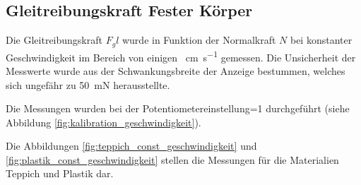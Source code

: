 

\subsection{Gleitreibungskraft Fester K\"orper}

Die  Gleitreibungskraft  $F_gl$  wurde  in  Funktion  der  Normalkraft  $N$  bei
konstanter Geschwindigkeit im Bereich von einigen \SI{}{\centi\meter\per\second}
gemessen.  Die  Unsicherheit  der Messwerte wurde aus der Schwankungsbreite  der
Anzeige   bestummen,   welches   sich   ungef\"ahr   zu   \SI{50}{\milli\newton}
herausstellte.

Die  Messungen  wurden bei der Potentiometereinstellung=1 durchgef\"uhrt  (siehe
Abbildung \ref{fig:kalibration_geschwindigkeit}).

Die        Abbildungen        \ref{fig:teppich_const_geschwindigkeit}        und
\ref{fig:plastik_const_geschwindigkeit}  stellen   die   Messungen   f\"ur   die
Materialien Teppich und Plastik dar.

